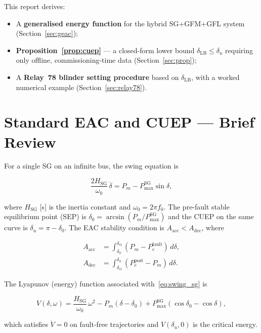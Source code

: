 \documentclass[11pt,a4paper]{article}
\newcommand{\dz}{\delta_0}         %
\newcommand{\du}{\delta_u}         %
\newcommand{\dlb}{\delta_{\mathrm{LB}}}   %
\newcommand{\dcl}{\delta_{\mathrm{cl}}}   %
\newcommand{\Pm}{P_m}
\newcommand{\PmaxSG}{P_{\max}^{\mathrm{SG}}}
\newcommand{\Hsg}{H_{\mathrm{SG}}}
\newcommand{\omegaz}{\omega_0}
\newcommand{\Aacc}{A_{\mathrm{acc}}}
\newcommand{\Adec}{A_{\mathrm{dec}}}
\begin{document}
This report derives:
\begin{itemize}
  \item A \textbf{generalised energy function} for the hybrid SG+GFM+GFL system
        (Section~\ref{sec:geac});
  \item \textbf{Proposition~\ref{prop:cuep}} — a closed-form lower bound
        $\dlb \leq \du$ requiring only offline, commissioning-time data
        (Section~\ref{sec:prop});
  \item A \textbf{Relay~78 blinder setting procedure} based on $\dlb$, with
        a worked numerical example (Section~\ref{sec:relay78}).
\end{itemize}

\section{Standard EAC and CUEP — Brief Review}
\label{sec:standard}

For a single SG on an infinite bus, the swing equation is

\begin{equation}
  \frac{2\Hsg}{\omegaz}\,\ddot{\delta}
  = \Pm - \PmaxSG\sin\delta,
  \label{eq:swing_sg}
\end{equation}

where $\Hsg$ [s] is the inertia constant and $\omegaz = 2\pi f_0$.
The pre-fault stable equilibrium point (SEP) is $\dz = \arcsin(\Pm/\PmaxSG)$
and the CUEP on the same curve is $\du = \pi - \dz$.  The EAC stability
condition is $\Aacc < \Adec$, where

\begin{align}
  \Aacc &= \int_{\dz}^{\dcl}(\Pm - P_e^{\mathrm{fault}})\,d\delta,
  \label{eq:Aacc}\\
  \Adec &= \int_{\dcl}^{\du}(P_e^{\mathrm{post}} - \Pm)\,d\delta.
  \label{eq:Adec}
\end{align}

The Lyapunov (energy) function associated with~\eqref{eq:swing_sg} is

\begin{equation}
  V(\delta, \omega) = \frac{\Hsg}{\omegaz}\,\omega^2
    - \Pm(\delta - \dz) + \PmaxSG(\cos\dz - \cos\delta),
  \label{eq:lyap_sg}
\end{equation}

which satisfies $\dot{V} = 0$ on fault-free trajectories and $V(\du,0)$ is
the critical energy.
\end{document}

